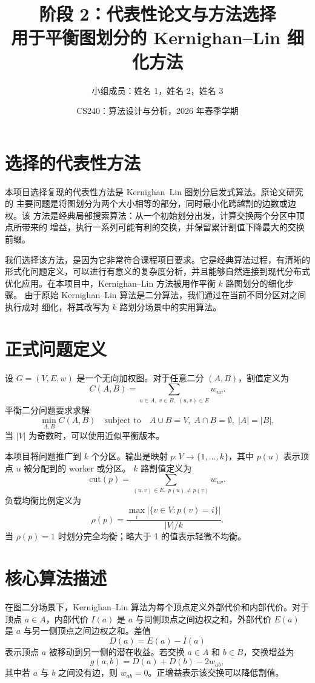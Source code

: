 \documentclass[UTF8, 11pt]{ctexart}
\title{\textbf{阶段 2：代表性论文与方法选择}\\
用于平衡图划分的 Kernighan--Lin 细化方法}
\author{小组成员：姓名 1，姓名 2，姓名 3}
\date{CS240：算法设计与分析，2026 年春季学期}
\begin{document}
\maketitle

\section{选择的代表性方法}

本项目选择复现的代表性方法是 Kernighan--Lin 图划分启发式算法。原论文研究的
主要问题是将图划分为两个大小相等的部分，同时最小化跨越割的边数或边权。该
方法是经典局部搜索算法：从一个初始划分出发，计算交换两个分区中顶点所带来的
增益，执行一系列可能有利的交换，并保留累计割值下降最大的交换前缀。

我们选择该方法，是因为它非常符合课程项目要求。它是经典算法过程，有清晰的
形式化问题定义，可以进行有意义的复杂度分析，并且能够自然连接到现代分布式
优化应用。在本项目中，Kernighan--Lin 方法被用作平衡 $k$ 路图划分的细化步骤。
由于原始 Kernighan--Lin 算法是二分算法，我们通过在当前不同分区对之间执行成对
细化，将其改写为 $k$ 路划分场景中的实用算法。

\section{正式问题定义}

设 $G=(V,E,w)$ 是一个无向加权图。对于任意二分 $(A,B)$，割值定义为
\[
    C(A,B) = \sum_{u\in A,\;v\in B,\;(u,v)\in E} w_{uv}.
\]
平衡二分问题要求求解
\[
    \min_{A,B} C(A,B)
    \quad
    \text{subject to}
    \quad
    A\cup B=V,\; A\cap B=\emptyset,\; |A|=|B|,
\]
当 $|V|$ 为奇数时，可以使用近似平衡版本。

本项目将问题推广到 $k$ 个分区。输出是映射
$p:V\to\{1,\ldots,k\}$，其中 $p(u)$ 表示顶点 $u$ 被分配到的 worker 或分区。
$k$ 路割值定义为
\[
    \mathrm{cut}(p)
    =
    \sum_{(u,v)\in E,\; p(u)\neq p(v)} w_{uv}.
\]
负载均衡比例定义为
\[
    \rho(p)
    =
    \frac{\max_i |\{v\in V:p(v)=i\}|}{|V|/k}.
\]
当 $\rho(p)=1$ 时划分完全均衡；略大于 1 的值表示轻微不均衡。

\section{核心算法描述}

在图二分场景下，Kernighan--Lin 算法为每个顶点定义外部代价和内部代价。对于
顶点 $a\in A$，内部代价 $I(a)$ 是 $a$ 与同侧顶点之间边权之和，外部代价
$E(a)$ 是 $a$ 与另一侧顶点之间边权之和。差值
\[
    D(a) = E(a) - I(a)
\]
表示顶点 $a$ 被移动到另一侧的潜在收益。若交换 $a\in A$ 和 $b\in B$，交换增益为
\[
    g(a,b) = D(a) + D(b) - 2w_{ab},
\]
其中若 $a$ 与 $b$ 之间没有边，则 $w_{ab}=0$。正增益表示该交换可以降低割值。
\end{document}
